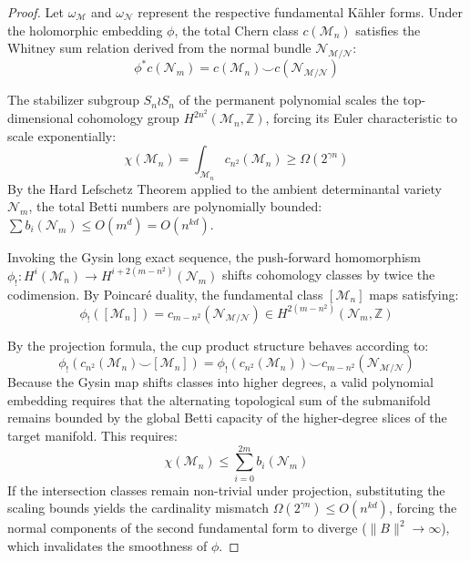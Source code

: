 \documentclass{article}
\begin{document}
\begin{proof}
Let $\omega_{\mathcal{M}}$ and $\omega_{\mathcal{N}}$ represent the respective fundamental K\"ahler forms. Under the holomorphic embedding $\phi$, the total Chern class $c(\mathcal{M}_n)$ satisfies the Whitney sum relation derived from the normal bundle $\mathcal{N}_{\mathcal{M}/\mathcal{N}}$:
\begin{equation}
\phi^* c(\mathcal{N}_m) = c(\mathcal{M}_n) \smallsmile c(\mathcal{N}_{\mathcal{M}/\mathcal{N}})
\end{equation}

The stabilizer subgroup $S_n \wr S_n$ of the permanent polynomial scales the top-dimensional cohomology group $H^{2n^2}(\mathcal{M}_n, \mathbb{Z})$, forcing its Euler characteristic to scale exponentially:
\begin{equation}
\chi(\mathcal{M}_n) = \int_{\mathcal{M}_n} c_{n^2}(\mathcal{M}_n) \geq \Omega(2^{\gamma n})
\end{equation}
By the Hard Lefschetz Theorem applied to the ambient determinantal variety $\mathcal{N}_m$, the total Betti numbers are polynomially bounded: $\sum b_i(\mathcal{N}_m) \leq O(m^d) = O(n^{kd})$.

Invoking the Gysin long exact sequence, the push-forward homomorphism $\phi_!: H^i(\mathcal{M}_n) \to H^{i+2(m-n^2)}(\mathcal{N}_m)$ shifts cohomology classes by twice the codimension. By Poincar\'e duality, the fundamental class $[\mathcal{M}_n]$ maps satisfying:
\begin{equation}
\phi_!([\mathcal{M}_n]) = c_{m-n^2}(\mathcal{N}_{\mathcal{M}/\mathcal{N}}) \in H^{2(m-n^2)}(\mathcal{N}_m, \mathbb{Z})
\end{equation}

By the projection formula, the cup product structure behaves according to:
\begin{equation}
\phi_!(c_{n^2}(\mathcal{M}_n) \smallsmile [\mathcal{M}_n]) = \phi_!(c_{n^2}(\mathcal{M}_n)) \smallsmile c_{m-n^2}(\mathcal{N}_{\mathcal{M}/\mathcal{N}})
\end{equation}
Because the Gysin map shifts classes into higher degrees, a valid polynomial embedding requires that the alternating topological sum of the submanifold remains bounded by the global Betti capacity of the higher-degree slices of the target manifold. This requires:
\begin{equation}
\chi(\mathcal{M}_n) \leq \sum_{i=0}^{2m} b_i(\mathcal{N}_m)
\end{equation}
If the intersection classes remain non-trivial under projection, substituting the scaling bounds yields the cardinality mismatch $\Omega(2^{\gamma n}) \leq O(n^{kd})$, forcing the normal components of the second fundamental form to diverge ($\|B\|^2 \rightarrow \infty$), which invalidates the smoothness of $\phi$.
\end{proof}
\end{document}
